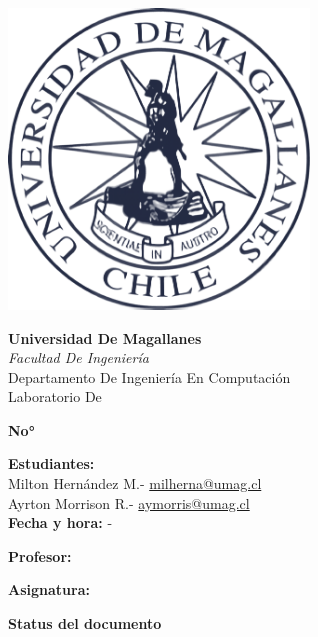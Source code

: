\begin{titlepage}
    \centering
    \begin{center}
        \begin{minipage}[c]{0.3\textwidth}
            \centering
            \includegraphics[width=0.6\textwidth]{src/images/logoUmag.png}
        \end{minipage}\hfill
        \begin{minipage}[c]{0.7\textwidth}
            \centering
            \textbf{Universidad De Magallanes}\\
            \textit{Facultad De Ingeniería}\\
            Departamento De Ingeniería En Computación\\
            Laboratorio De \docsubject\\
        \end{minipage}
    \end{center}
    \vspace{1cm}
    {\LARGE \doctitle \par}
    {\large\bfseries\doctype No° \docnumber\par}
    \vspace{3cm}
    {\large \textbf{Estudiantes:} \\
    Milton Hernández M.- \href{mailto:milherna@umag.cl}{milherna@umag.cl}\\
    Ayrton Morrison R.- \href{mailto:aymorris@umag.cl}{aymorris@umag.cl}\\}
    \vspace{0.3cm}
    \textbf{Fecha y hora:} {\docdate - \doctime} \\
    \vspace{0.3cm}
    {\large \textbf{Profesor:} \docprofessor \par}
    \vspace{0.3cm}
    {\large \textbf{Asignatura:} \docsubject \par}
    \vspace{1.5cm}
    {\LARGE\bfseries Status del documento \par}
    
    \vfill
\end{titlepage}